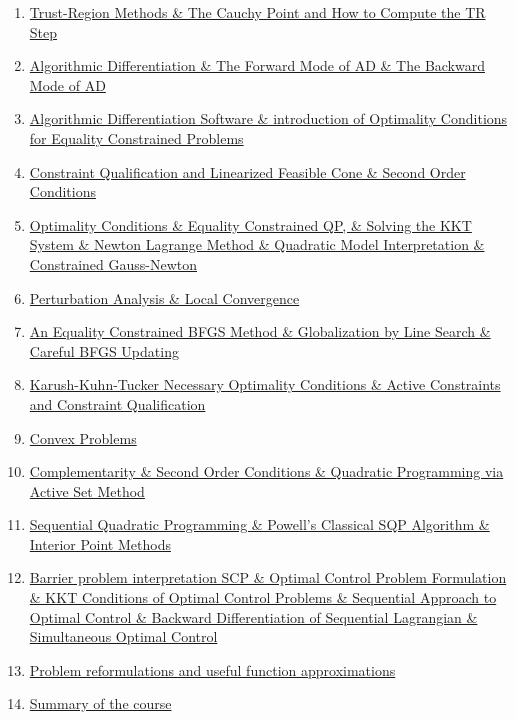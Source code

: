\documentclass[11pt]{article}
\begin{document}
\begin{enumerate}
	\item \href{https://mp.weixin.qq.com/s/NFniwDaiMOJ9zDdhsKryrA}{Trust-Region Methods \& The Cauchy Point and How to Compute the TR Step}	%
	\item \href{https://mp.weixin.qq.com/s/crGGsb423QrI083zP5a6vw}{Algorithmic Differentiation \& The Forward Mode of AD \& The Backward Mode of AD}	%
	\item \href{https://mp.weixin.qq.com/s/SU44gqXgkaIaUG-8547qMg}{Algorithmic Differentiation Software \& introduction of Optimality Conditions for Equality Constrained Problems}	%
	\item \href{https://mp.weixin.qq.com/s/PZnsWmdFDXk1PB5ZHP-DmA}{Constraint Qualification and Linearized Feasible Cone \& Second Order Conditions}	%
	\item \href{https://mp.weixin.qq.com/s/ctnwBjaxnOerKFgLzb6DSg}{Optimality Conditions \& Equality Constrained QP, \& Solving the KKT System \& Newton Lagrange Method \& Quadratic Model Interpretation \& Constrained Gauss-Newton }	%
	\item \href{https://mp.weixin.qq.com/s/bBInvyZzxNnteCT0yJ7ahg}{Perturbation Analysis \& Local Convergence }	%
	\item \href{https://mp.weixin.qq.com/s/Df_d0kaZ9hlalE79Qxz-iA}{An Equality Constrained BFGS Method \& Globalization by Line Search \& Careful BFGS Updating}	%
	\item \href{https://mp.weixin.qq.com/s/J5EONVHbKHnRFmsFjcOPNw}{Karush-Kuhn-Tucker Necessary Optimality Conditions \& Active Constraints and Constraint Qualification}	%
	\item \href{https://mp.weixin.qq.com/s/lADTUC891fp40JSN5bxRUw}{Convex Problems}	%
	\item \href{https://mp.weixin.qq.com/s/nUR97tJ_I0s9mJQkEUU05A}{Complementarity \& Second Order Conditions \& Quadratic Programming via Active Set Method}	%
	\item \href{https://mp.weixin.qq.com/s/k70wJka54NF2GJV5B1--9w}{Sequential Quadratic Programming \& Powell's Classical SQP Algorithm \& Interior Point Methods}	%
	\item \href{https://mp.weixin.qq.com/s/9GqjZnqM_I1JZqHJI7C3uw}{Barrier problem interpretation SCP \& Optimal Control Problem Formulation \& KKT Conditions of Optimal Control Problems \& Sequential Approach to Optimal Control \&  Backward Differentiation of Sequential Lagrangian \& Simultaneous Optimal Control}	%
	\item \href{https://mp.weixin.qq.com/s/MKALMXhS1O16y5XI67x2CQ}{Problem reformulations and useful function approximations}	%
	\item \href{https://mp.weixin.qq.com/s/aP1fNofIN8uIyiOmQYfhtA}{Summary of the course}	%
\end{enumerate}
\end{document}
